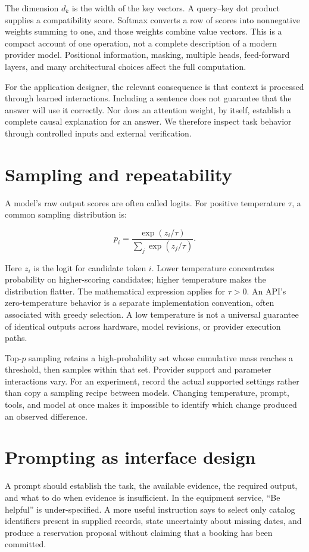 The dimension \(d_k\) is the width of the key vectors. A query–key dot product supplies a compatibility score. Softmax converts a row of scores into nonnegative weights summing to one, and those weights combine value vectors. This is a compact account of one operation, not a complete description of a modern provider model. Positional information, masking, multiple heads, feed-forward layers, and many architectural choices affect the full computation.

For the application designer, the relevant consequence is that context is processed through learned interactions. Including a sentence does not guarantee that the answer will use it correctly. Nor does an attention weight, by itself, establish a complete causal explanation for an answer. We therefore inspect task behavior through controlled inputs and external verification.

\section{Sampling and repeatability}
A model's raw output scores are often called logits. For positive temperature \(\tau\), a common sampling distribution is:

\begin{equation}
p_i=\frac{\exp(z_i/\tau)}{\sum_j\exp(z_j/\tau)}.
\end{equation}

Here \(z_i\) is the logit for candidate token \(i\). Lower temperature concentrates probability on higher-scoring candidates; higher temperature makes the distribution flatter. The mathematical expression applies for \(\tau>0\). An API's zero-temperature behavior is a separate implementation convention, often associated with greedy selection. A low temperature is not a universal guarantee of identical outputs across hardware, model revisions, or provider execution paths.

Top-\(p\) sampling retains a high-probability set whose cumulative mass reaches a threshold, then samples within that set. Provider support and parameter interactions vary. For an experiment, record the actual supported settings rather than copy a sampling recipe between models. Changing temperature, prompt, tools, and model at once makes it impossible to identify which change produced an observed difference.

\section{Prompting as interface design}
A prompt should establish the task, the available evidence, the required output, and what to do when evidence is insufficient. In the equipment service, “Be helpful” is under-specified. A more useful instruction says to select only catalog identifiers present in supplied records, state uncertainty about missing dates, and produce a reservation proposal without claiming that a booking has been committed.

